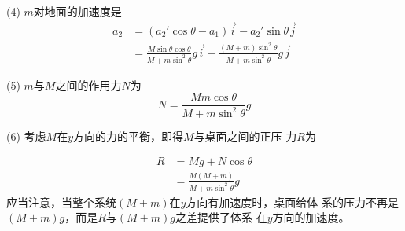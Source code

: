 (4) $ m $对地面的加速度是
\begin{align*}
  a _ { 2 } & = \left( a _ { 2 }' \cos \theta - a _ { 1 } \right) \vec{i} - a _ 2 ' \sin \theta \vec{j}                                                                                  \\
            & = \frac { M \sin \theta \cos \theta } { M + m \sin ^ { 2 } \theta } g \vec{i} - \frac { \left( M + m \right) \sin ^ { 2 } \theta } { M + m \sin ^ { 2 } \theta } g \vec{j}
\end{align*}

(5) $ m $与$ M $之间的作用力$ N $为
\begin{equation*}
  N = \frac { M  m \cos \theta } { M + m \sin ^ { 2 } \theta } g
\end{equation*}

(6) 考虑$ M $在$ y $方向的力的平衡，即得$ M $与桌面之间的正压
力$ R $为

\begin{align*}
  R & = M g + N \cos \theta                                              \\
    & = \frac { M \left( M + m \right) } { M + m \sin ^ { 2 } \theta } g
\end{align*}
应当注意，当整个系统$  \left( M + m \right)  $在$ y $方向有加速度时，桌面给体
系的压力不再是$  \left( M + m \right) g  $，而是$ R $与$  \left( M + m \right) g  $之差提供了体系
在$ y $方向的加速度。